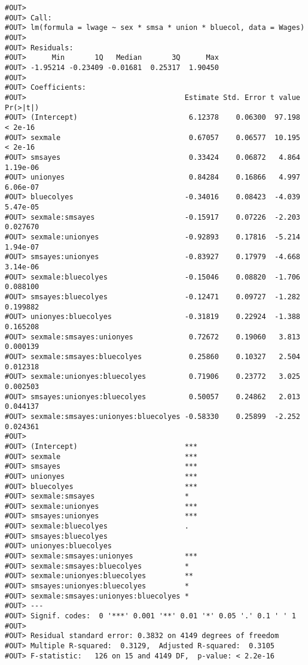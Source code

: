 \documentclass[]{book}
\begin{document}
\begin{verbatim}
#OUT> 
#OUT> Call:
#OUT> lm(formula = lwage ~ sex * smsa * union * bluecol, data = Wages)
#OUT> 
#OUT> Residuals:
#OUT>      Min       1Q   Median       3Q      Max 
#OUT> -1.95214 -0.23409 -0.01681  0.25317  1.90450 
#OUT> 
#OUT> Coefficients:
#OUT>                                     Estimate Std. Error t value Pr(>|t|)
#OUT> (Intercept)                          6.12378    0.06300  97.198  < 2e-16
#OUT> sexmale                              0.67057    0.06577  10.195  < 2e-16
#OUT> smsayes                              0.33424    0.06872   4.864 1.19e-06
#OUT> unionyes                             0.84284    0.16866   4.997 6.06e-07
#OUT> bluecolyes                          -0.34016    0.08423  -4.039 5.47e-05
#OUT> sexmale:smsayes                     -0.15917    0.07226  -2.203 0.027670
#OUT> sexmale:unionyes                    -0.92893    0.17816  -5.214 1.94e-07
#OUT> smsayes:unionyes                    -0.83927    0.17979  -4.668 3.14e-06
#OUT> sexmale:bluecolyes                  -0.15046    0.08820  -1.706 0.088100
#OUT> smsayes:bluecolyes                  -0.12471    0.09727  -1.282 0.199882
#OUT> unionyes:bluecolyes                 -0.31819    0.22924  -1.388 0.165208
#OUT> sexmale:smsayes:unionyes             0.72672    0.19060   3.813 0.000139
#OUT> sexmale:smsayes:bluecolyes           0.25860    0.10327   2.504 0.012318
#OUT> sexmale:unionyes:bluecolyes          0.71906    0.23772   3.025 0.002503
#OUT> smsayes:unionyes:bluecolyes          0.50057    0.24862   2.013 0.044137
#OUT> sexmale:smsayes:unionyes:bluecolyes -0.58330    0.25899  -2.252 0.024361
#OUT>                                        
#OUT> (Intercept)                         ***
#OUT> sexmale                             ***
#OUT> smsayes                             ***
#OUT> unionyes                            ***
#OUT> bluecolyes                          ***
#OUT> sexmale:smsayes                     *  
#OUT> sexmale:unionyes                    ***
#OUT> smsayes:unionyes                    ***
#OUT> sexmale:bluecolyes                  .  
#OUT> smsayes:bluecolyes                     
#OUT> unionyes:bluecolyes                    
#OUT> sexmale:smsayes:unionyes            ***
#OUT> sexmale:smsayes:bluecolyes          *  
#OUT> sexmale:unionyes:bluecolyes         ** 
#OUT> smsayes:unionyes:bluecolyes         *  
#OUT> sexmale:smsayes:unionyes:bluecolyes *  
#OUT> ---
#OUT> Signif. codes:  0 '***' 0.001 '**' 0.01 '*' 0.05 '.' 0.1 ' ' 1
#OUT> 
#OUT> Residual standard error: 0.3832 on 4149 degrees of freedom
#OUT> Multiple R-squared:  0.3129,  Adjusted R-squared:  0.3105 
#OUT> F-statistic:   126 on 15 and 4149 DF,  p-value: < 2.2e-16
\end{verbatim}
\end{document}
